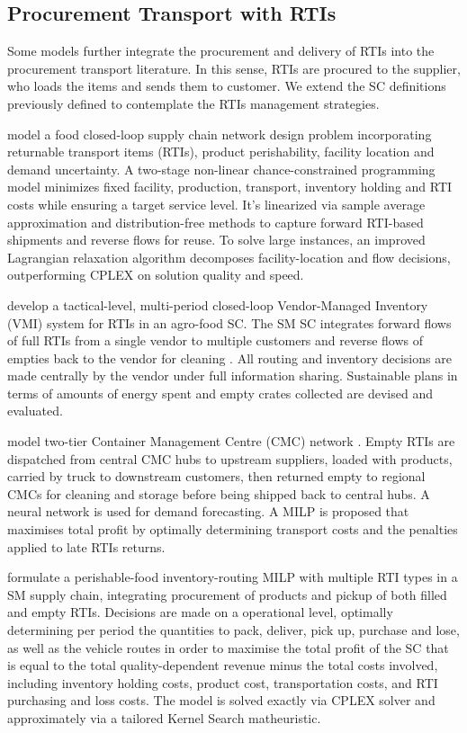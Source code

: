 \subsection{Procurement Transport with RTIs}
Some models further integrate the procurement and delivery of RTIs into the procurement transport literature. In this sense, RTIs are procured to the supplier, who loads the items and sends them to customer. We extend the SC definitions previously defined to contemplate the RTIs management strategies.

model a food closed-loop supply chain network design problem incorporating returnable transport items (RTIs), product perishability, facility location and demand uncertainty. A two-stage non-linear chance-constrained programming model minimizes fixed facility, production, transport, inventory holding and RTI costs while ensuring a target service level. It’s linearized via sample average approximation and distribution-free methods to capture forward RTI-based shipments and reverse flows for reuse. To solve large instances, an improved Lagrangian relaxation algorithm decomposes facility-location and flow decisions, outperforming CPLEX on solution quality and speed.


\autocite{SOYSAL2023101504} develop a tactical-level, multi-period closed-loop Vendor-Managed Inventory (VMI) system for RTIs in an agro-food SC. The SM SC integrates forward flows of full RTIs from a single vendor to multiple customers and reverse flows of empties back to the vendor for cleaning . All routing and inventory decisions are made centrally by the vendor under full information sharing. Sustainable plans in terms of amounts of energy spent and empty crates collected are devised and evaluated.


\autocite{GUO2024104339} model two-tier Container Management Centre (CMC) network . Empty RTIs are dispatched from central CMC hubs to upstream suppliers, loaded with products, carried by truck to downstream customers, then returned empty to regional CMCs for cleaning and storage before being shipped back to central hubs. A neural network is used for demand forecasting. A MILP is proposed that maximises total profit by optimally determining transport costs and the penalties applied to late RTIs returns.


\autocite{Zhang17012024} formulate a perishable-food inventory-routing MILP with multiple RTI types in a SM supply chain, integrating procurement of products and pickup of both filled and empty RTIs. Decisions are made on a operational level, optimally determining per period the quantities to pack, deliver, pick up, purchase and lose, as well as the vehicle routes in order to maximise the total profit of the SC that is equal to the total quality-dependent revenue minus the total costs involved, including inventory holding costs, product cost, transportation costs, and RTI purchasing and loss costs. The model is solved exactly via CPLEX  solver and approximately via a tailored Kernel Search matheuristic.


